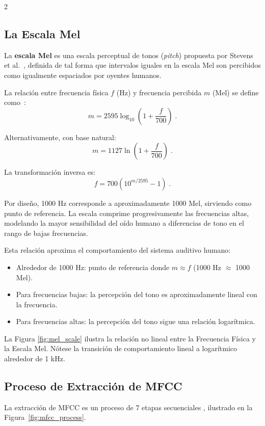 \documentclass[12pt]{report}
\newenvironment{tightmulticols}{%
  \begin{multicols}{2}
  \setlength{\parskip}{1.2pt}
  \linespread{1}\selectfont
}{%
  \end{multicols}
}
\begin{document}
\begin{tightmulticols}
\subsection{La Escala Mel}

\noindent \noindent La \textbf{escala Mel} es una escala perceptual de tonos (\textit{pitch}) propuesta por Stevens et al.~\cite{stevens1937scale}, definida de tal forma que intervalos iguales en la escala Mel son percibidos como igualmente espaciados por oyentes humanos.

\par La relación entre frecuencia física $f$ (Hz) y frecuencia percibida $m$ (Mel) se define como~\cite{shimodaira2013speech, zheng2001comparison}:
\begin{equation}
    m = 2595 \log_{10}\left(1 + \frac{f}{700}\right) \; .
    \label{eq:mel_scale}
\end{equation}

\noindent Alternativamente, con base natural:
\begin{equation}
    m = 1127 \ln\left(1 + \frac{f}{700}\right) \; .
\end{equation}

\noindent La transformación inversa es:
\begin{equation}
    f = 700\left(10^{m/2595} - 1\right) \; .
\end{equation}

\noindent Por diseño, 1000 Hz corresponde a aproximadamente 1000 Mel, sirviendo como punto de referencia. La escala comprime progresivamente las frecuencias altas, modelando la mayor sensibilidad del oído humano a diferencias de tono en el rango de bajas frecuencias.

\par Esta relación aproxima el comportamiento del sistema auditivo humano:
\begin{itemize}
    \item Alrededor de 1000 Hz: punto de referencia donde $m \approx f$ (1000 Hz $\approx$ 1000 Mel).
    \item Para frecuencias bajas: la percepción del tono es aproximadamente lineal con la frecuencia.
    \item Para frecuencias altas: la percepción del tono sigue una relación logarítmica.
\end{itemize}

\noindent La Figura \ref{fig:mel_scale} ilustra la relación no lineal entre la Frecuencia Física y la Escala Mel. Nótese la transición de comportamiento lineal a logarítmico alrededor de 1 kHz.

\subsection{Proceso de Extracción de MFCC}

\noindent La extracción de MFCC es un proceso de 7 etapas secuenciales \cite{ruvinga2023}, ilustrado en la Figura~\ref{fig:mfcc_process}.

\end{tightmulticols}
\end{document}
